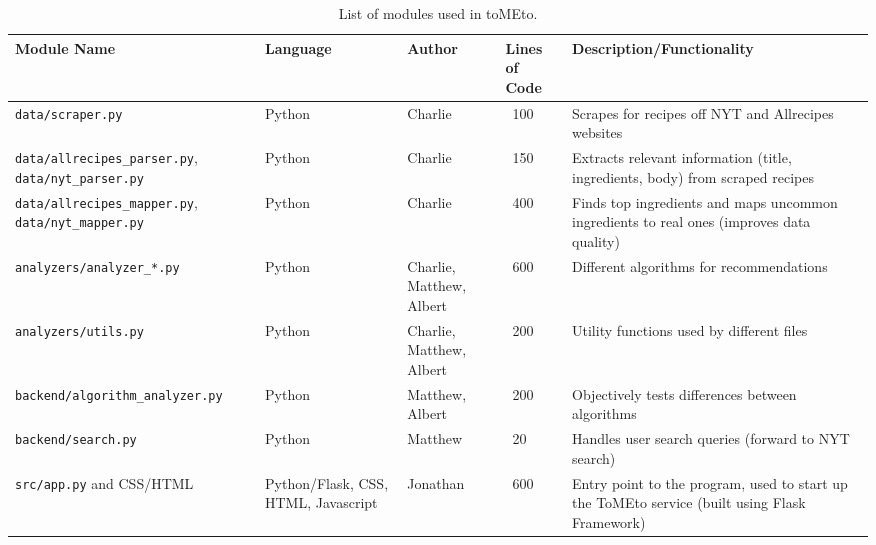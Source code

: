 \documentclass{acm_proc_article-sp}
\begin{document}
\begin{table}[h]
    \centering
    \begin{tabular}{ | p{5cm} | p{2cm} | p{2cm} | p{1cm} | p{6cm} |}
    \hline
    Module Name & Language & Author & Lines of Code & Description/Functionality \\  \hline
    \texttt{data/scraper.py} & Python & Charlie & ~100 & Scrapes for recipes off NYT and Allrecipes websites \\ \hline
    \texttt{data/allrecipes\_parser.py},
    \texttt{data/nyt\_parser.py} & Python & Charlie & ~150 & Extracts relevant information (title, ingredients, body) from scraped recipes \\ \hline
    \texttt{data/allrecipes\_mapper.py},
    \texttt{data/nyt\_mapper.py} & Python & Charlie & ~400 & Finds top ingredients and maps uncommon ingredients to real ones (improves data quality) \\ \hline
    \texttt{analyzers/analyzer\_*.py} & Python & Charlie, Matthew, Albert & ~600 & Different algorithms for recommendations \\ \hline
    \texttt{analyzers/utils.py} & Python & Charlie, Matthew, Albert & ~200 & Utility functions used by different files \\ \hline
    \texttt{backend/algorithm\_analyzer.py} & Python & Matthew, Albert & ~200 & Objectively tests differences between algorithms \\ \hline
    \texttt{backend/search.py} & Python & Matthew & ~20 & Handles user search queries (forward to NYT search) \\ \hline
    \texttt{src/app.py} and CSS/HTML & Python/Flask, CSS, HTML, Javascript & Jonathan & ~600 & Entry point to the program, used to start up the ToMEto service (built using Flask Framework) \\ \hline
    \end{tabular}
    \caption{List of modules used in toMEto.}
\end{table}
\end{document}
